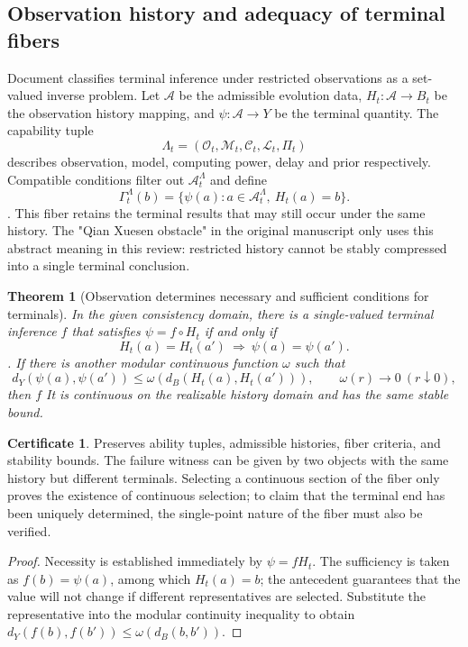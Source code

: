 \documentclass[11pt,a4paper]{article}
\theoremstyle{plain}
\newtheorem{theorem}{Theorem}[section]
\theoremstyle{definition}
\newtheorem*{certificate}{Certificate}
\theoremstyle{remark}
\begin{document}
\begin{CJK*}
\subsection { Observation history and adequacy of terminal fibers }

Document \cite{S28} classifies terminal inference under restricted observations as a set-valued inverse problem. Let $\mathcal A$ be the admissible evolution data, $H_t:\mathcal A\to B_t$ be the observation history mapping, and $\psi:\mathcal A\to Y$ be the terminal quantity. The capability tuple \[
 \Lambda_t=(\mathcal O_t,\mathcal M_t,\mathcal C_t,\mathcal L_t,\Pi_t)
\] describes observation, model, computing power, delay and prior respectively. Compatible conditions filter out $\mathcal A_t^{\Lambda}$ and define \[
 \Gamma_t^{\Lambda}(b)
 =\{\psi(a):a\in\mathcal A_t^{\Lambda},\ H_t(a)=b\}.
\]. This fiber retains the terminal results that may still occur under the same history. The "Qian Xuesen obstacle" in the original manuscript only uses this abstract meaning in this review: restricted history cannot be stably compressed into a single terminal conclusion.

\begin{theorem}
[Observation determines necessary and sufficient conditions for terminals]\label{ss:observability}
In the given consistency domain, there is a single-valued terminal inference $f$ that satisfies $\psi=f\circ H_t$ if and only if \[
 H_t(a)=H_t(a')\ \Longrightarrow\ \psi(a)=\psi(a').
\]. If there is another modular continuous function $\omega$ such that \[
 d_Y(\psi(a),\psi(a'))\le\omega(d_B(H_t(a),H_t(a'))),
 \qquad \omega(r)\to0\ (r\downarrow0),
\] then $f$ It is continuous on the realizable history domain and has the same stable bound.\end{theorem}
\begin{certificate}
Preserves ability tuples, admissible histories, fiber criteria, and stability bounds. The failure witness can be given by two objects with the same history but different terminals. Selecting a continuous section of the fiber only proves the existence of continuous selection; to claim that the terminal end has been uniquely determined, the single-point nature of the fiber must also be verified.\end{certificate}
\begin{proof}
Necessity is established immediately by $\psi=fH_t$. The sufficiency is taken as $f(b)=\psi(a)$, among which $H_t(a)=b$; the antecedent guarantees that the value will not change if different representatives are selected. Substitute the representative into the modular continuity inequality to obtain $d_Y(f(b),f(b'))\le\omega(d_B(b,b'))$.\end{proof}



\end{CJK*}
\end{document}
